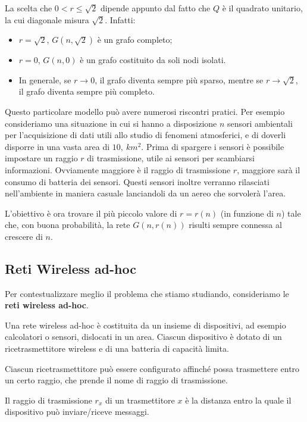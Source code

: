 La scelta che $0 < r \leq \sqrt{2}$ dipende appunto dal fatto che $Q$ è il quadrato unitario, la cui diagonale misura $\sqrt{2}$. Infatti:
\begin{itemize}
    \item $r = \sqrt{2}$, $G(n, \sqrt{2})$ è un grafo completo;
    \item $r = 0$, $G(n, 0)$ è un grafo costituito da soli nodi isolati.
    \item In generale, se $r \rightarrow 0$, il grafo diventa sempre più sparso, mentre se $r \rightarrow \sqrt{2}$, il grafo diventa sempre più completo.
\end{itemize}

Questo particolare modello può avere numerosi riscontri pratici.
Per esempio consideriamo una situazione in cui si hanno a disposizione $n$ sensori ambientali per l'acquisizione di dati utili allo studio di fenomeni atmosferici, e di doverli disporre in una vasta area di $10,\ km^2$. 
Prima di spargere i sensori è possibile impostare un raggio 
$r$ di trasmissione, utile ai sensori per scambiarsi informazioni. Ovviamente maggiore è il raggio di trasmissione  $r$, maggiore sarà il consumo di batteria dei sensori.
Questi sensori inoltre verranno rilasciati nell'ambiente in maniera casuale lanciandoli da un aereo che sorvolerà l'area.

L'obiettivo è ora trovare il più piccolo valore di $r = r(n)$ (in funzione di $n$) tale che, con buona probabilità, la rete $G(n, r(n))$ risulti sempre connessa al crescere di $n$.

\subsection{Reti Wireless ad-hoc}

Per contestualizzare meglio il problema che stiamo studiando, consideriamo le \textbf{reti wireless ad-hoc}.

Una rete wireless ad-hoc è costituita da un insieme di dispositivi, ad esempio calcolatori o sensori, dislocati in un area. Ciascun dispositivo è dotato di un ricetrasmettitore wireless e di una batteria di capacità limita.

Ciascun ricetrasmettitore può essere configurato affinché possa trasmettere entro un certo raggio, che prende il nome di raggio di trasmissione.
\begin{definizione}
    Il raggio di trasmissione $r_x$ di un trasmettitore $x$ è la distanza entro la quale il dispositivo può inviare/riceve messaggi.    
\end{definizione}

